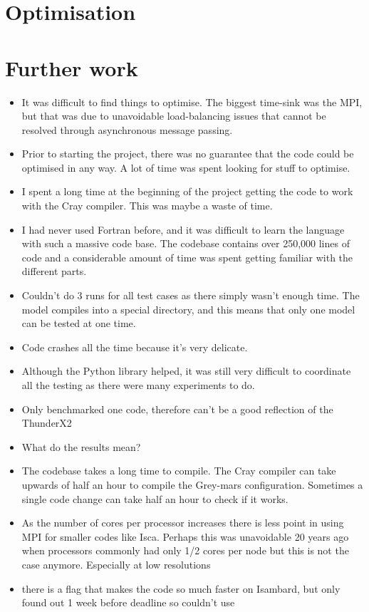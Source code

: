 \documentclass[a4paper,11pt]{report}
\begin{document}
\section{Optimisation}

\section{Further work}


\begin{itemize}
	\item It was difficult to find things to optimise. The biggest time-sink was the MPI, but that was due to unavoidable load-balancing issues that cannot be resolved through asynchronous message passing. 
	\item Prior to starting the project, there was no guarantee that the code could be optimised in any way. A lot of time was spent looking for stuff to optimise. 
	\item I spent a long time at the beginning of the project getting the code to work with the Cray compiler. This was maybe a waste of time. 
	\item I had never used Fortran before, and it was difficult to learn the language with such a massive code base. The codebase contains over 250,000 lines of code and a considerable amount of time was spent getting familiar with the different parts. 
	\item Couldn't do 3 runs for all test cases as there simply wasn't enough time. The model compiles into a special directory, and this means that only one model can be tested at one time. 
	\item Code crashes all the time because it's very delicate. 
	\item Although the Python library helped, it was still very difficult to coordinate all the testing as there were many experiments to do.
	\item Only benchmarked one code, therefore can't be a good reflection of the ThunderX2
	\item What do the results mean? 
	\item The codebase takes a long time to compile. The Cray compiler can take upwards of half an hour to compile the Grey-mars configuration. Sometimes a single code change can take half an hour to check if it works. 
	\item As the number of cores per processor increases there is less point in using MPI for smaller codes like Isca. Perhaps this was unavoidable 20 years ago when processors commonly had only 1/2 cores per node but this is not the case anymore. Especially at low resolutions
	\item there is a flag that makes the code so much faster on Isambard, but only found out 1 week before deadline so couldn't use 
\end{itemize}
\end{document}
